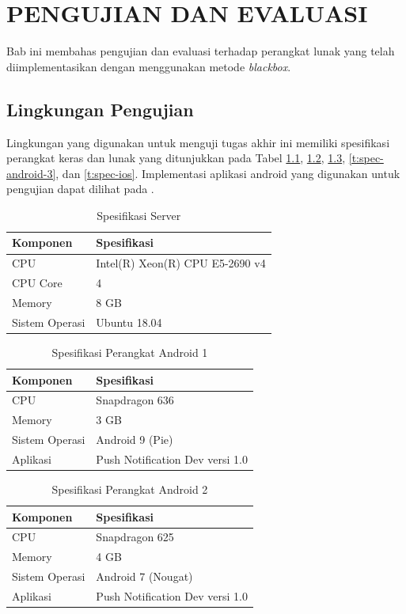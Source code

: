 \chapter{PENGUJIAN DAN EVALUASI}
\par Bab ini membahas pengujian dan evaluasi terhadap perangkat lunak yang telah diimplementasikan dengan menggunakan metode \textit{blackbox}.

\section{Lingkungan Pengujian}
\par Lingkungan yang digunakan untuk menguji tugas akhir ini memiliki spesifikasi perangkat keras dan lunak yang ditunjukkan pada Tabel \ref{t:spec-server}, \ref{t:spec-android}, \ref{t:spec-android-2}, \ref{t:spec-android-3}, dan \ref{t:spec-ios}. Implementasi aplikasi android yang digunakan untuk pengujian dapat dilihat pada .
\begin{longtable}{|p{3cm}|p{6cm}|}
	\caption{Spesifikasi Server} \label{t:spec-server} \\ \hline
    \rowcolor{lightgray} Komponen & Spesifikasi \\ \hline
    \endhead
    CPU & Intel(R) Xeon(R) CPU E5-2690 v4 \\ \hline
    CPU Core & 4 \\ \hline
    Memory & 8 GB \\ \hline
    Sistem Operasi & Ubuntu 18.04 \\ \hline
\end{longtable}
\begin{longtable}{|p{3cm}|p{6cm}|}
	\caption{Spesifikasi Perangkat Android 1} \label{t:spec-android} \\ \hline
	\rowcolor{lightgray} Komponen & Spesifikasi \\ \hline
	\endhead
    CPU & Snapdragon 636 \\ \hline
    Memory & 3 GB \\ \hline
    Sistem Operasi & Android 9 (Pie) \\ \hline
    Aplikasi & Push Notification Dev versi 1.0 \\ \hline
\end{longtable}
\begin{longtable}{|p{3cm}|p{6cm}|}
\caption{Spesifikasi Perangkat Android 2} \label{t:spec-android-2} \\ \hline
\rowcolor{lightgray} Komponen & Spesifikasi \\ \hline
\endhead
CPU & Snapdragon 625 \\ \hline
Memory & 4 GB \\ \hline
Sistem Operasi & Android 7 (Nougat) \\ \hline
Aplikasi & Push Notification Dev versi 1.0 \\ \hline
\end{longtable}
